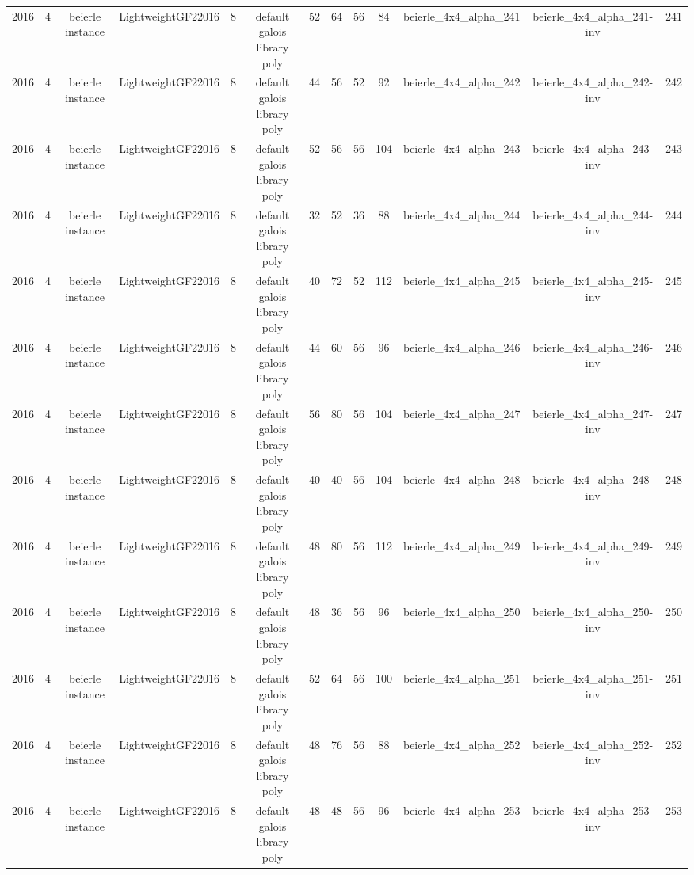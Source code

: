\begin{tabular}{c c c c c c c c c c c c c}
2016 & 4 & beierle instance & LightweightGF22016 & 8 & default galois library poly & 52 & 64 & 56 & 84 & beierle_4x4_alpha_241 & beierle_4x4_alpha_241-inv & 241 \\
2016 & 4 & beierle instance & LightweightGF22016 & 8 & default galois library poly & 44 & 56 & 52 & 92 & beierle_4x4_alpha_242 & beierle_4x4_alpha_242-inv & 242 \\
2016 & 4 & beierle instance & LightweightGF22016 & 8 & default galois library poly & 52 & 56 & 56 & 104 & beierle_4x4_alpha_243 & beierle_4x4_alpha_243-inv & 243 \\
2016 & 4 & beierle instance & LightweightGF22016 & 8 & default galois library poly & 32 & 52 & 36 & 88 & beierle_4x4_alpha_244 & beierle_4x4_alpha_244-inv & 244 \\
2016 & 4 & beierle instance & LightweightGF22016 & 8 & default galois library poly & 40 & 72 & 52 & 112 & beierle_4x4_alpha_245 & beierle_4x4_alpha_245-inv & 245 \\
2016 & 4 & beierle instance & LightweightGF22016 & 8 & default galois library poly & 44 & 60 & 56 & 96 & beierle_4x4_alpha_246 & beierle_4x4_alpha_246-inv & 246 \\
2016 & 4 & beierle instance & LightweightGF22016 & 8 & default galois library poly & 56 & 80 & 56 & 104 & beierle_4x4_alpha_247 & beierle_4x4_alpha_247-inv & 247 \\
2016 & 4 & beierle instance & LightweightGF22016 & 8 & default galois library poly & 40 & 40 & 56 & 104 & beierle_4x4_alpha_248 & beierle_4x4_alpha_248-inv & 248 \\
2016 & 4 & beierle instance & LightweightGF22016 & 8 & default galois library poly & 48 & 80 & 56 & 112 & beierle_4x4_alpha_249 & beierle_4x4_alpha_249-inv & 249 \\
2016 & 4 & beierle instance & LightweightGF22016 & 8 & default galois library poly & 48 & 36 & 56 & 96 & beierle_4x4_alpha_250 & beierle_4x4_alpha_250-inv & 250 \\
2016 & 4 & beierle instance & LightweightGF22016 & 8 & default galois library poly & 52 & 64 & 56 & 100 & beierle_4x4_alpha_251 & beierle_4x4_alpha_251-inv & 251 \\
2016 & 4 & beierle instance & LightweightGF22016 & 8 & default galois library poly & 48 & 76 & 56 & 88 & beierle_4x4_alpha_252 & beierle_4x4_alpha_252-inv & 252 \\
2016 & 4 & beierle instance & LightweightGF22016 & 8 & default galois library poly & 48 & 48 & 56 & 96 & beierle_4x4_alpha_253 & beierle_4x4_alpha_253-inv & 253 \\

\end{tabular}
